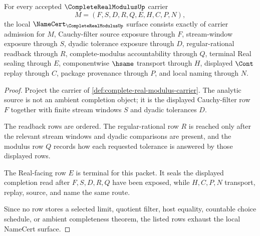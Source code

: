 \begin{theorem}
\label{thm:complete-real-modulus-namecert-obligations}
For every accepted $\CompleteRealModulusUp$ carrier
$$
M=(F,S,D,R,Q,E,H,C,P,N),
$$
the local $\NameCert_{\CompleteRealModulusUp}$ surface consists exactly of carrier admission for $M$, Cauchy-filter source exposure through $F$, stream-window exposure through $S$, dyadic tolerance exposure through $D$, regular-rational readback through $R$, complete-modulus accountability through $Q$, terminal Real sealing through $E$, componentwise $\hsame$ transport through $H$, displayed $\Cont$ replay through $C$, package provenance through $P$, and local naming through $N$.
\end{theorem}
\begin{proof}
Project the carrier of \autoref{def:complete-real-modulus-carrier}. The analytic source is not an ambient completion object; it is the displayed Cauchy-filter row $F$ together with finite stream windows $S$ and dyadic tolerances $D$.

The readback rows are ordered. The regular-rational row $R$ is reached only after the relevant stream windows and dyadic comparisons are present, and the modulus row $Q$ records how each requested tolerance is answered by those displayed rows.

The Real-facing row $E$ is terminal for this packet. It seals the displayed completion read after $F,S,D,R,Q$ have been exposed, while $H,C,P,N$ transport, replay, source, and name the same route.

Since no row stores a selected limit, quotient filter, host equality, countable choice schedule, or ambient completeness theorem, the listed rows exhaust the local NameCert surface.
\end{proof}

